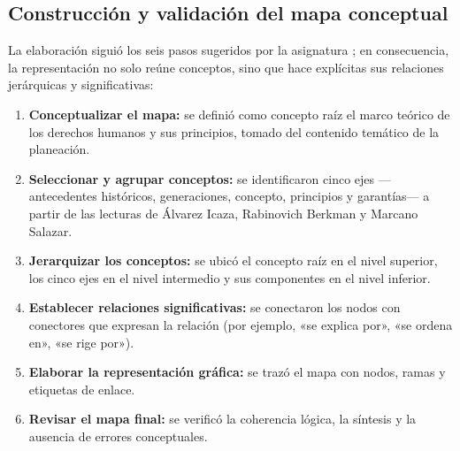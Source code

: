 ﻿\documentclass[
  spanish,
  letterpaper, oneside
]{article}
\begin{document}
\subsection{Construcción y validación del mapa conceptual}

La elaboración siguió los seis pasos sugeridos por la asignatura \citep{lopezMapaConceptual2022}; en consecuencia, la representación no solo reúne conceptos, sino que hace explícitas sus relaciones jerárquicas y significativas:

\begin{enumerate}\setlength{\itemsep}{0pt}\setlength{\parskip}{0pt}
  \item \textbf{Conceptualizar el mapa:} se definió como concepto raíz el marco teórico de los derechos humanos y sus principios, tomado del contenido temático de la planeación.
  \item \textbf{Seleccionar y agrupar conceptos:} se identificaron cinco ejes —antecedentes históricos, generaciones, concepto, principios y garantías— a partir de las lecturas de Álvarez Icaza, Rabinovich Berkman y Marcano Salazar.
  \item \textbf{Jerarquizar los conceptos:} se ubicó el concepto raíz en el nivel superior, los cinco ejes en el nivel intermedio y sus componentes en el nivel inferior.
  \item \textbf{Establecer relaciones significativas:} se conectaron los nodos con conectores que expresan la relación (por ejemplo, «se explica por», «se ordena en», «se rige por»).
  \item \textbf{Elaborar la representación gráfica:} se trazó el mapa con nodos, ramas y etiquetas de enlace.
  \item \textbf{Revisar el mapa final:} se verificó la coherencia lógica, la síntesis y la ausencia de errores conceptuales.
\end{enumerate}
\end{document}

